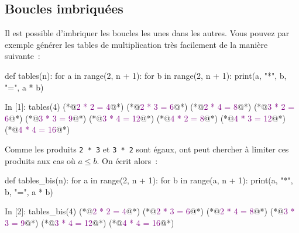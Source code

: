 \documentclass{magnolia}
\begin{document}



\subsection{Boucles imbriquées}

Il est possible d'imbriquer les boucles les unes dans les autres. Vous pouvez par exemple générer les tables de multiplication très facilement de la manière suivante~:

\begin{pythoncodeline}
def tables(n):
    for a in range(2, n + 1):
        for b in range(2, n + 1):
            print(a, "*", b, "=", a * b)
\end{pythoncodeline}
\begin{pythoncode}
In [1]: tables(4)
(*@\textcolor{purple}{2 * 2 = 4}@*)
(*@\textcolor{purple}{2 * 3 = 6}@*)
(*@\textcolor{purple}{2 * 4 = 8}@*)
(*@\textcolor{purple}{3 * 2 = 6}@*)
(*@\textcolor{purple}{3 * 3 = 9}@*)
(*@\textcolor{purple}{3 * 4 = 12}@*)
(*@\textcolor{purple}{4 * 2 = 8}@*)
(*@\textcolor{purple}{4 * 3 = 12}@*)
(*@\textcolor{purple}{4 * 4 = 16}@*)
\end{pythoncode}
Comme les produits \verb!2 * 3! et \verb!3 * 2! sont égaux, ont peut chercher à limiter
ces produits aux cas où $a \leq b$. On écrit alors~:
\begin{pythoncodeline}
def tables_bis(n):
    for a in range(2, n + 1):
        for b in range(a, n + 1):
            print(a, "*", b, "=", a * b)
\end{pythoncodeline}
\begin{pythoncode}
In [2]: tables_bis(4)
(*@\textcolor{purple}{2 * 2 = 4}@*)
(*@\textcolor{purple}{2 * 3 = 6}@*)
(*@\textcolor{purple}{2 * 4 = 8}@*)
(*@\textcolor{purple}{3 * 3 = 9}@*)
(*@\textcolor{purple}{3 * 4 = 12}@*)
(*@\textcolor{purple}{4 * 4 = 16}@*)
\end{pythoncode}
\end{document}
